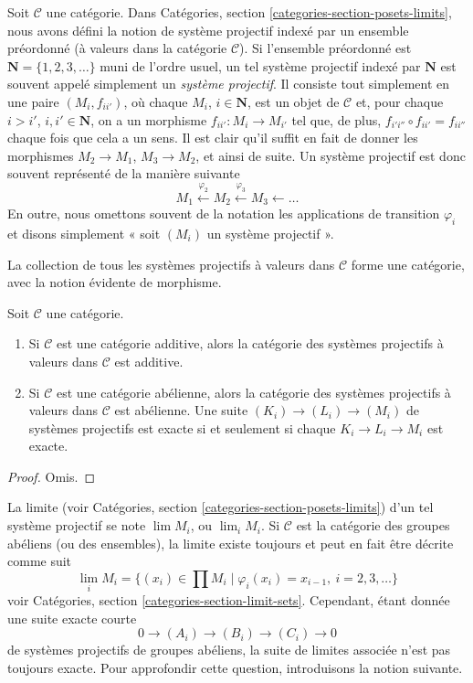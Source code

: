\noindent
Soit $\mathcal{C}$ une catégorie.
Dans Catégories, section \ref{categories-section-posets-limits},
nous avons défini la notion de système projectif indexé par un ensemble
préordonné (à valeurs dans la catégorie $\mathcal{C}$).
Si l'ensemble préordonné est $\mathbf{N} = \{1, 2, 3, \ldots\}$
muni de l'ordre usuel, un tel système projectif indexé par $\mathbf{N}$
est souvent appelé simplement un {\it système projectif}. Il consiste tout
simplement en une paire $(M_i, f_{ii'})$, où chaque $M_i$,
$i \in \mathbf{N}$, est un objet de $\mathcal{C}$ et, pour chaque
$i > i'$, $i, i' \in \mathbf{N}$, on a un morphisme
$f_{ii'} : M_i \to M_{i'}$ tel que, de plus,
$f_{i'i''} \circ f_{ii'} = f_{ii''}$ chaque fois que cela a un sens.
Il est clair qu'il suffit en fait de donner les morphismes
$M_2 \to M_1$, $M_3 \to M_2$, et ainsi de suite. Un système projectif
est donc souvent représenté de la manière suivante
$$
M_1 \xleftarrow{\varphi_2} M_2 \xleftarrow{\varphi_3} M_3 \leftarrow \ldots
$$
En outre, nous omettons souvent de la notation les applications de transition
$\varphi_i$ et disons simplement « soit $(M_i)$ un système projectif ».

\medskip\noindent
La collection de tous les systèmes projectifs à valeurs dans
$\mathcal{C}$ forme une catégorie, avec la notion évidente de morphisme.

\begin{lemma}
\label{lemma-inverse-systems-abelian}
Soit $\mathcal{C}$ une catégorie.
\begin{enumerate}
\item Si $\mathcal{C}$ est une catégorie additive, alors la catégorie
des systèmes projectifs à valeurs dans $\mathcal{C}$ est additive.
\item Si $\mathcal{C}$ est une catégorie abélienne, alors la catégorie
des systèmes projectifs à valeurs dans $\mathcal{C}$ est abélienne.
Une suite $(K_i) \to (L_i) \to (M_i)$ de systèmes projectifs
est exacte si et seulement si chaque $K_i \to L_i \to M_i$ est exacte.
\end{enumerate}
\end{lemma}

\begin{proof}
Omis.
\end{proof}

\noindent
La limite (voir Catégories, section \ref{categories-section-posets-limits})
d'un tel système projectif se note $\lim M_i$, ou $\lim_i M_i$.
Si $\mathcal{C}$ est la catégorie des groupes abéliens (ou des ensembles),
la limite existe toujours et peut en fait être décrite comme suit
$$
\lim_i M_i
=
\{(x_i) \in \prod M_i \mid \varphi_i(x_i) = x_{i - 1}, \ i = 2, 3, \ldots\}
$$
voir Catégories, section \ref{categories-section-limit-sets}.
Cependant, étant donnée une suite exacte courte
$$
0 \to (A_i) \to (B_i) \to (C_i) \to 0
$$
de systèmes projectifs de groupes abéliens, la suite de limites associée
n'est pas toujours exacte. Pour approfondir cette question, introduisons
la notion suivante.

